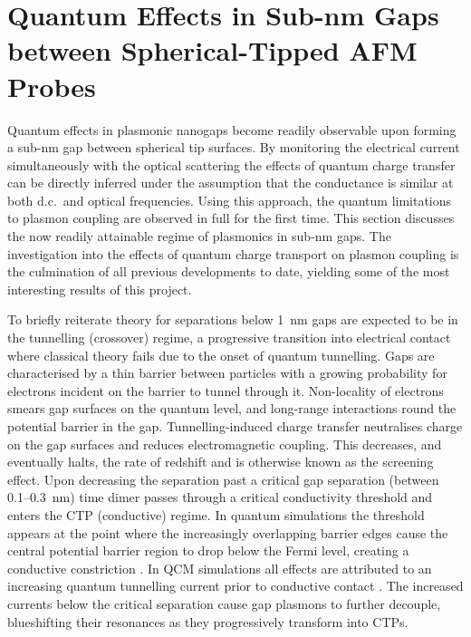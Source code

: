 \documentclass[a4paper, 11pt]{article}
\begin{document}
\section{Quantum Effects in Sub-nm Gaps between Spherical-Tipped AFM Probes}

Quantum effects in plasmonic nanogaps become readily observable upon forming a sub-nm gap between spherical tip surfaces. By monitoring the electrical current simultaneously with the optical scattering the effects of quantum charge transfer can be directly inferred under the assumption that the conductance is similar at both d.c.\ and optical frequencies. Using this approach, the quantum limitations to plasmon coupling are observed in full for the first time.
This section discusses the now readily attainable regime of plasmonics in sub-nm gaps. The investigation into the effects of quantum charge transport on plasmon coupling is the culmination of all previous developments to date, yielding some of the most interesting results of this project.

To briefly reiterate theory for separations below \SI{1}{nm} gaps are expected to be in the tunnelling (crossover) regime, a progressive transition into electrical contact where classical theory fails due to the onset of quantum tunnelling. Gaps are characterised by a thin barrier between particles with a growing probability for electrons incident on the barrier to tunnel through it. Non-locality of electrons smears gap surfaces on the quantum level, and long-range interactions round the potential barrier in the gap. Tunnelling-induced charge transfer neutralises charge on the gap surfaces and reduces electromagnetic coupling. This decreases, and eventually halts, the rate of redshift and is otherwise known as the screening effect. Upon decreasing the separation past a critical gap separation (between 0.1--\SI{0.3}{nm}) time dimer passes through a critical conductivity threshold and enters the CTP (conductive) regime. In quantum simulations the threshold appears at the point where the increasingly overlapping barrier edges cause the central potential barrier region to drop below the Fermi level, creating a conductive constriction \cite{zuloaga2009}. In QCM simulations all effects are attributed to an increasing quantum tunnelling current prior to conductive contact \cite{esteban2012, savage2012, esteban2015}. The increased currents below the critical separation cause gap plasmons to further decouple, blueshifting their resonances as they progressively transform into CTPs.
\end{document}
